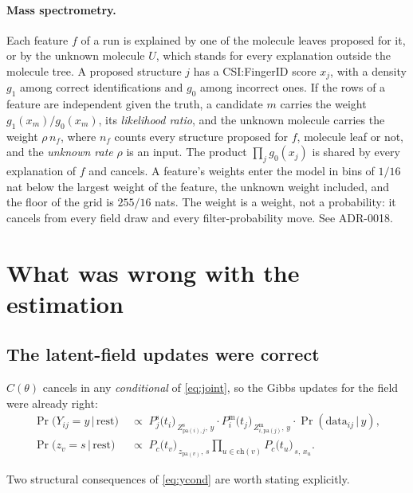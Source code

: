 \documentclass[11pt,a4paper]{article}
\newcommand{\Ys}{Y}
\newcommand{\Zs}{Z^{\mathrm{s}}}
\newcommand{\Zm}{Z^{\mathrm{m}}}
\newcommand{\pa}{\mathrm{pa}}
\newcommand{\ch}{\mathrm{ch}}
\newcommand{\given}{\,\vert\,}
\begin{document}
\paragraph{Mass spectrometry.} Each feature $f$ of a run is explained by one of the molecule
leaves proposed for it, or by the unknown molecule $U$, which stands for every explanation
outside the molecule tree. A proposed structure $j$ has a CSI:FingerID score $x_j$, with a
density $g_1$ among correct identifications and $g_0$ among incorrect ones. If the rows of
a feature are independent given the truth, a candidate $m$ carries the weight
$g_1(x_m)/g_0(x_m)$, its \emph{likelihood ratio}, and the unknown molecule carries the
weight $\rho\,n_f$, where $n_f$ counts every structure proposed for $f$, molecule leaf or
not, and the \emph{unknown rate} $\rho$ is an input. The product $\prod_j g_0(x_j)$ is shared
by every explanation of $f$ and cancels. A feature's weights enter the model in bins of
$1/16$ nat below the largest weight of the feature, the unknown weight included, and the
floor of the grid is $255/16$ nats. The weight is a weight, not a probability: it
cancels from every field draw and every filter-probability move. See ADR-0018.

\section{What was wrong with the estimation}
\label{sec:wrong}

\subsection{The latent-field updates were correct}

$C(\theta)$ cancels in any \emph{conditional} of \eqref{eq:joint}, so the Gibbs updates for
the field were already right:
\begin{align}
  \Pr\bigl(\Ys_{ij} = y \given \text{rest}\bigr)
  &\;\propto\;
  P^{\mathrm{s}}_{j}\bigl(t_i\bigr)_{\,\Zs_{\pa(i),j},\, y}
  \cdot
  P^{\mathrm{m}}_{i}\bigl(t_j\bigr)_{\,\Zm_{i,\pa(j)},\, y}
  \cdot
  \Pr(\text{data}_{ij} \given y),
  \label{eq:ycond}\\[4pt]
  \Pr\bigl(z_v = s \given \text{rest}\bigr)
  &\;\propto\;
  P_c\bigl(t_v\bigr)_{\,z_{\pa(v)},\, s}
  \prod_{u \in \ch(v)} P_c\bigl(t_u\bigr)_{\,s,\, x_u}.
  \label{eq:zcond}
\end{align}

Two structural consequences of \eqref{eq:ycond} are worth stating explicitly.
\end{document}
